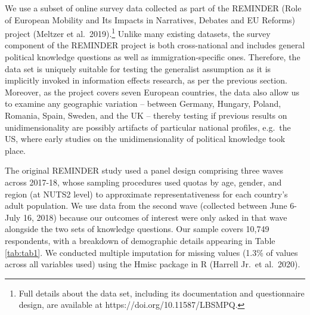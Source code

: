 \documentclass[11pt,halfline,a4paper,]{ouparticle}
\begin{document}
We use a subset of online survey data collected as part of the REMINDER
(Role of European Mobility and Its Impacts in Narratives, Debates and EU
Reforms) project (Meltzer et al.~2019).\footnote{Full details about the
  data set, including its documentation and questionnaire design, are
  available at https://doi.org/10.11587/LBSMPQ.} Unlike many existing
datasets, the survey component of the REMINDER project is both
cross-national and includes general political knowledge questions as
well as immigration-specific ones. Therefore, the data set is uniquely
suitable for testing the generalist assumption as it is implicitly
invoked in information effects research, as per the previous section.
Moreover, as the project covers seven European countries, the data also
allow us to examine any geographic variation -- between Germany,
Hungary, Poland, Romania, Spain, Sweden, and the UK -- thereby testing
if previous results on unidimensionality are possibly artifacts of
particular national profiles, e.g.~the US, where early studies on the
unidimensionality of political knowledge took place.

The original REMINDER study used a panel design comprising three waves
across 2017-18, whose sampling procedures used quotas by age, gender,
and region (at NUTS2 level) to approximate representativeness for each
country's adult population. We use data from the second wave (collected
between June 6-July 16, 2018) because our outcomes of interest were only
asked in that wave alongside the two sets of knowledge questions. Our
sample covers 10,749 respondents, with a breakdown of demographic
details appearing in Table \ref{tab:tab1}. We conducted multiple
imputation for missing values (1.3\% of values across all variables
used) using the Hmisc package in R (Harrell Jr.~et al.~2020).
\end{document}
